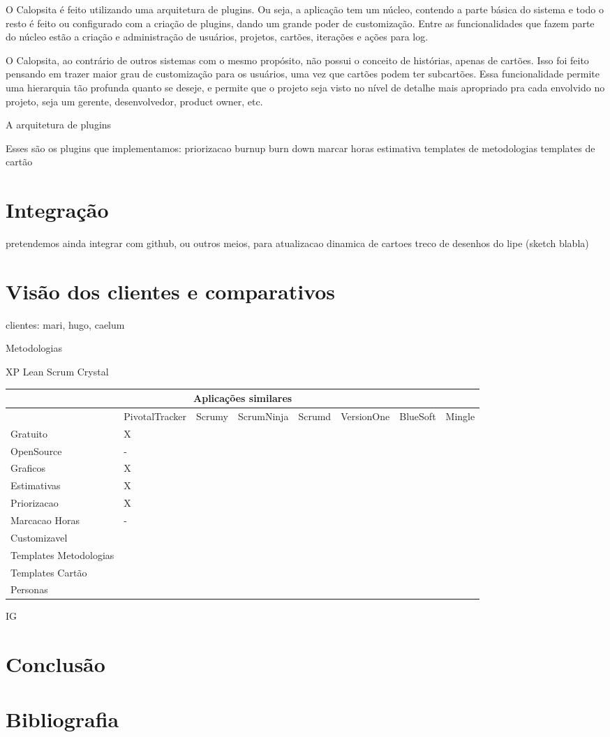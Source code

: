 \documentclass[titlepage,a4paper]{article}
\begin{document}
O Calopsita é feito utilizando uma arquitetura de plugins. Ou seja, a aplicação tem um núcleo, contendo a parte básica do sistema e todo o resto é feito ou configurado com a criação de plugins, dando um grande poder de customização.
Entre as funcionalidades que fazem parte do núcleo estão a criação e administração de usuários,
projetos, cartões, iterações e ações para log.

O Calopsita, ao contrário de outros sistemas com o mesmo propósito, não possui o conceito de histórias, apenas de cartões. Isso foi feito pensando em trazer maior grau de customização para os usuários, uma vez que cartões podem ter subcartões. Essa funcionalidade permite uma hierarquia tão profunda quanto se deseje, e permite que o projeto seja visto no nível de detalhe mais apropriado pra cada envolvido no projeto, seja um gerente, desenvolvedor, product owner, etc.

A arquitetura de plugins

Esses são os plugins que implementamos:
priorizacao
burnup
burn down
marcar horas
estimativa
templates de metodologias
templates de cartão

\section{Integração}
pretendemos ainda integrar com github, ou outros meios, para atualizacao dinamica de cartoes
treco de desenhos do lipe (sketch blabla)


\section{Visão dos clientes e comparativos}

clientes: mari, hugo, caelum

Metodologias

XP
Lean
Scrum
Crystal


\begin{sidewaystable}
	\begin{tabular}{|l|l|l|l|l|l|l|l}
		\hline
		\multicolumn{8}{|c|}{Aplicações similares} \\
		\hline
		 & PivotalTracker & Scrumy & ScrumNinja & Scrumd & VersionOne & BlueSoft & Mingle \\
		Gratuito & X & & & & & & \\
		OpenSource & - & & & & & & \\
		Graficos & X & & & & & & \\
		Estimativas & X & & & & & & \\
		Priorizacao & X & & & & & & \\
		Marcacao Horas & - & & & & & & \\
		Customizavel & & & & & & & \\
		Templates Metodologias & & & & & & & \\
		Templates Cartão & & & & & & & \\
		Personas & & & & & & & \\
		\hline
	\end{tabular}
\end{sidewaystable}

IG

\section{Conclusão}

\section{Bibliografia}
\end{document}
